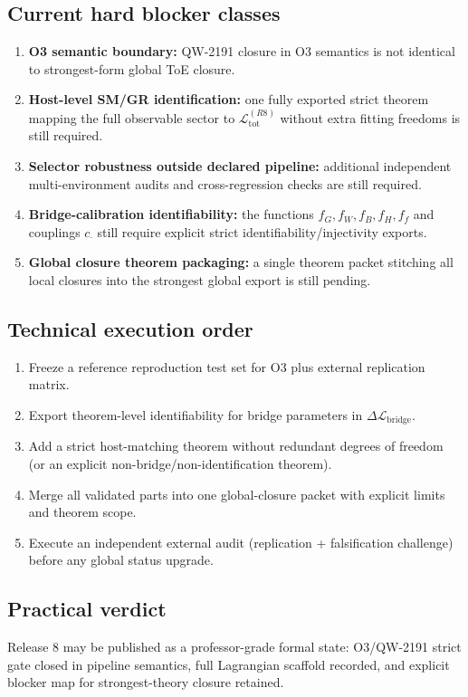 \documentclass[11pt,a4paper]{article}
\begin{document}
\subsection{Current hard blocker classes}
\begin{enumerate}[label=\arabic*.]
  \item \textbf{O3 semantic boundary:} QW-2191 closure in O3 semantics is not identical to strongest-form global ToE closure.
  \item \textbf{Host-level SM/GR identification:} one fully exported strict theorem mapping the full observable sector to \(\mathcal{L}_{\mathrm{tot}}^{(R8)}\) without extra fitting freedoms is still required.
  \item \textbf{Selector robustness outside declared pipeline:} additional independent multi-environment audits and cross-regression checks are still required.
  \item \textbf{Bridge-calibration identifiability:} the functions \(f_G,f_W,f_B,f_H,f_f\) and couplings \(c_\cdot\) still require explicit strict identifiability/injectivity exports.
  \item \textbf{Global closure theorem packaging:} a single theorem packet stitching all local closures into the strongest global export is still pending.
\end{enumerate}

\subsection{Technical execution order}
\begin{enumerate}[label=\textbf{R8-B\arabic*}]
  \item Freeze a reference reproduction test set for O3 plus external replication matrix.
  \item Export theorem-level identifiability for bridge parameters in \(\Delta\mathcal{L}_{\mathrm{bridge}}\).
  \item Add a strict host-matching theorem without redundant degrees of freedom (or an explicit non-bridge/non-identification theorem).
  \item Merge all validated parts into one global-closure packet with explicit limits and theorem scope.
  \item Execute an independent external audit (replication + falsification challenge) before any global status upgrade.
\end{enumerate}

\subsection{Practical verdict}
Release 8 may be published as a professor-grade formal state: O3/QW-2191 strict gate closed in pipeline semantics,
full Lagrangian scaffold recorded, and explicit blocker map for strongest-theory closure retained.
\end{document}

